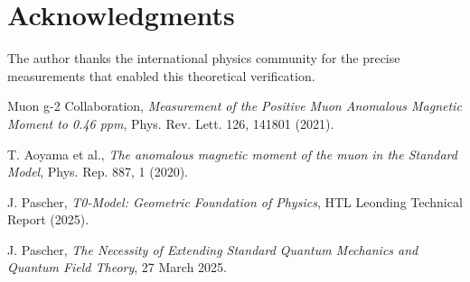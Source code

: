 \documentclass[12pt,a4paper]{article}
\begin{document}
	\section*{Acknowledgments}
	
	The author thanks the international physics community for the precise measurements that enabled this theoretical verification.
	
	\begin{thebibliography}{9}
		Muon g-2 Collaboration,
		\textit{Measurement of the Positive Muon Anomalous Magnetic Moment to 0.46 ppm},
		Phys. Rev. Lett. 126, 141801 (2021).
		
		T. Aoyama et al.,
		\textit{The anomalous magnetic moment of the muon in the Standard Model},
		Phys. Rep. 887, 1 (2020).
		
		J. Pascher,
		\textit{T0-Model: Geometric Foundation of Physics},
		HTL Leonding Technical Report (2025).
		
		J. Pascher,
		\textit{The Necessity of Extending Standard Quantum Mechanics and Quantum Field Theory},
		27 March 2025.
		
	\end{thebibliography}
	
\end{document}
